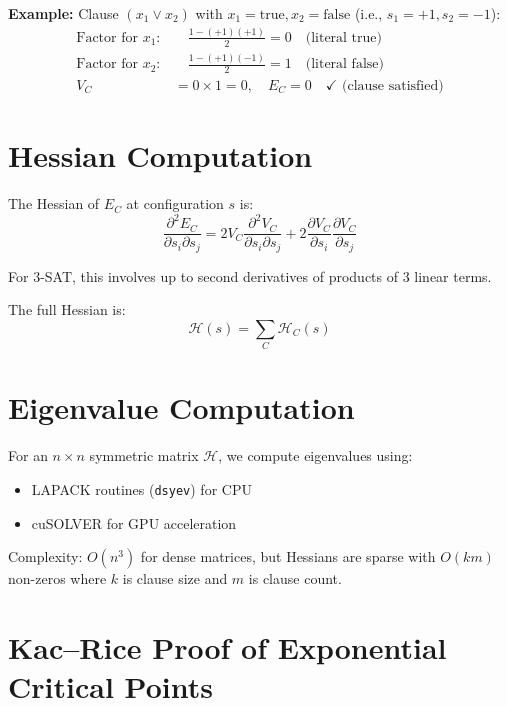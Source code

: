 \documentclass[11pt,a4paper]{article}
\theoremstyle{plain}
\theoremstyle{definition}
\theoremstyle{remark}
\newcommand{\Hess}{\mathcal{H}}
\newcommand{\threeSAT}{\textsc{3-SAT}}
\begin{document}
\textbf{Example:} Clause $(x_1 \vee x_2)$ with $x_1 = \text{true}, x_2 = \text{false}$ (i.e., $s_1 = +1, s_2 = -1$):
\begin{align}
    \text{Factor for } x_1: & \quad \frac{1 - (+1)(+1)}{2} = 0 \quad \text{(literal true)} \\
    \text{Factor for } x_2: & \quad \frac{1 - (+1)(-1)}{2} = 1 \quad \text{(literal false)} \\
    V_C &= 0 \times 1 = 0, \quad E_C = 0 \quad \checkmark \text{ (clause satisfied)}
\end{align}

\section{Hessian Computation}

The Hessian of $E_C$ at configuration $s$ is:
\begin{equation}
    \frac{\partial^2 E_C}{\partial s_i \partial s_j} = 2 V_C \frac{\partial^2 V_C}{\partial s_i \partial s_j} + 2 \frac{\partial V_C}{\partial s_i} \frac{\partial V_C}{\partial s_j}
\end{equation}

For \threeSAT, this involves up to second derivatives of products of 3 linear terms.

The full Hessian is:
\begin{equation}
    \Hess(s) = \sum_{C} \Hess_C(s)
\end{equation}

\section{Eigenvalue Computation}

For an $n \times n$ symmetric matrix $\Hess$, we compute eigenvalues using:
\begin{itemize}
    \item LAPACK routines (\texttt{dsyev}) for CPU
    \item cuSOLVER for GPU acceleration
\end{itemize}

Complexity: $O(n^3)$ for dense matrices, but Hessians are sparse with $O(km)$ non-zeros where $k$ is clause size and $m$ is clause count.

\section{Kac--Rice Proof of Exponential Critical Points}
\label{app:kac-rice}
\end{document}
